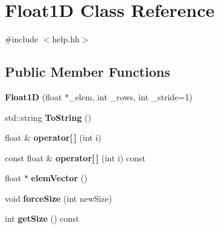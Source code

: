 \hypertarget{classFloat1D}{\section{Float1\-D Class Reference}
\label{classFloat1D}
}


{\ttfamily \#include $<$help.\-hh$>$}

\subsection*{Public Member Functions}
\begin{DoxyCompactItemize}
\item 
\hypertarget{classFloat1D_abac72fb922ec7c6d05818be856ede9a2}{{\bfseries Float1\-D} (float $\ast$\-\_\-elem, int \-\_\-rows, int \-\_\-stride=1)}\label{classFloat1D_abac72fb922ec7c6d05818be856ede9a2}

\item 
\hypertarget{classFloat1D_ab5c51078ce867170570f54f6fed7af7e}{std\-::string {\bfseries To\-String} ()}\label{classFloat1D_ab5c51078ce867170570f54f6fed7af7e}

\item 
\hypertarget{classFloat1D_a4602b1598eaf2e130a55df93b9723e91}{float \& {\bfseries operator\mbox{[}$\,$\mbox{]}} (int i)}\label{classFloat1D_a4602b1598eaf2e130a55df93b9723e91}

\item 
\hypertarget{classFloat1D_af3356b364d5ff56f3740729724da0467}{const float \& {\bfseries operator\mbox{[}$\,$\mbox{]}} (int i) const }\label{classFloat1D_af3356b364d5ff56f3740729724da0467}

\item 
\hypertarget{classFloat1D_a2e7889e514588f539a8dc47c75e70601}{float $\ast$ {\bfseries elem\-Vector} ()}\label{classFloat1D_a2e7889e514588f539a8dc47c75e70601}

\item 
\hypertarget{classFloat1D_a8af61aafa38fdab2e9bdbeb7eba563c6}{void {\bfseries force\-Size} (int new\-Size)}\label{classFloat1D_a8af61aafa38fdab2e9bdbeb7eba563c6}

\item 
\hypertarget{classFloat1D_a247a2e783f7300467c55fa2e7b19aa43}{int {\bfseries get\-Size} () const }\label{classFloat1D_a247a2e783f7300467c55fa2e7b19aa43}

\end{DoxyCompactItemize}


